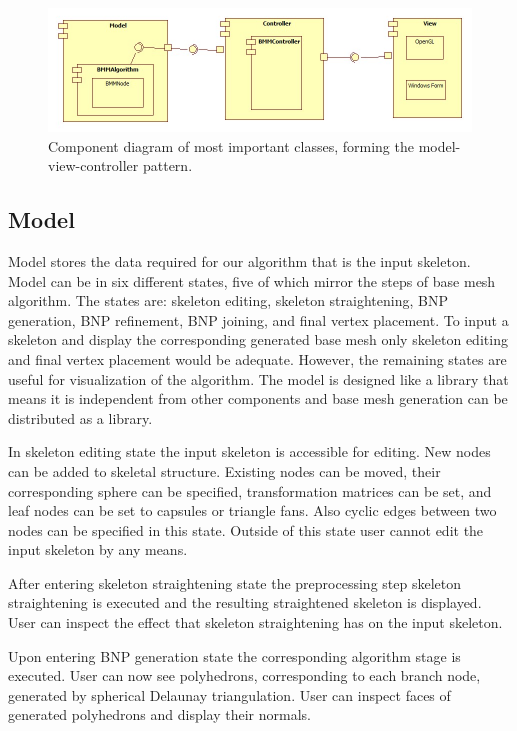 \begin{figure}[h]
    \centering
    \includegraphics[width=\textwidth]{images/classes}
    \caption[Component diagram of classes]{Component diagram of most important classes, forming the model-view-controller pattern.}
    \label{fig:classes}
\end{figure}

\subsection{Model}

Model stores the data required for our algorithm that is the input skeleton.
Model can be in six different states, five of which mirror the steps of base mesh algorithm.
The states are: skeleton editing, skeleton straightening, BNP generation, BNP refinement, BNP joining, and final vertex placement.
To input a skeleton and display the corresponding generated base mesh only skeleton editing and final vertex placement would be adequate.
However, the remaining states are useful for visualization of the algorithm.
The model is designed like a library that means it is independent from other components and base mesh generation can be distributed as a library.

In skeleton editing state the input skeleton is accessible for editing.
New nodes can be added to skeletal structure.
Existing nodes can be moved, their corresponding sphere can be specified, transformation matrices can be set, and leaf nodes can be set to capsules or triangle fans.
Also cyclic edges between two nodes can be specified in this state.
Outside of this state user cannot edit the input skeleton by any means.

After entering skeleton straightening state the preprocessing step skeleton straightening is executed and the resulting straightened skeleton is displayed.
User can inspect the effect that skeleton straightening has on the input skeleton.

Upon entering BNP generation state the corresponding algorithm stage is executed.
User can now see polyhedrons, corresponding to each branch node, generated by spherical Delaunay triangulation.
User can inspect faces of generated polyhedrons and display their normals.

